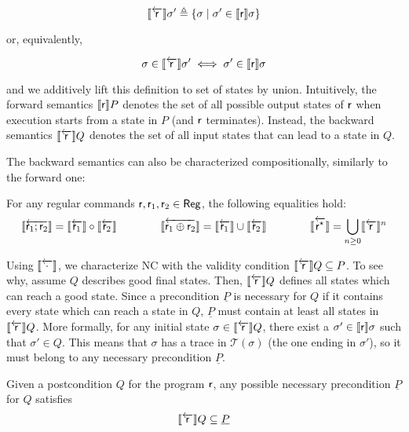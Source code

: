 \begin{equation}
	\llbracket\overleftarrow{\mathsf{r}}\rrbracket \sigma' \triangleq \{ \sigma \mid \sigma' \in \llbracket\mathsf{r}\rrbracket \sigma \} \label{eq:sil:bwsem-definition}
\end{equation}

\noindent or, equivalently,

\begin{equation}
	\sigma \in \llbracket\overleftarrow{\mathsf{r}}\rrbracket \sigma' \iff \sigma' \in \llbracket\mathsf{r}\rrbracket \sigma  \label{eq:sil:bwsem-sigma-sigma'}
\end{equation}

\noindent and we additively lift this definition to set of states by union.
Intuitively, the forward semantics $\llbracket\mathsf{r}\rrbracket P$ denotes the set of all possible output states of $\mathsf{r}$ when execution starts from a state in $P$ (and $\mathsf{r}$ terminates).
Instead, the backward semantics $\llbracket\overleftarrow{\mathsf{r}}\rrbracket Q$ denotes the set of all input states that can lead to a state in $Q$.

The backward semantics can also be characterized compositionally, similarly to the forward one:

\begin{lemma}\label{lmm:sil:bwsem-calculus}
	For any regular commands $\mathsf{r},\mathsf{r}_1,\mathsf{r}_2\in \mathsf{Reg}$, the following equalities hold:
	\[
	\llbracket\overleftarrow{\mathsf{r}_1; \mathsf{r}_2}\rrbracket = \llbracket\overleftarrow{\mathsf{r}_1}\rrbracket \circ \llbracket\overleftarrow{\mathsf{r}_2}\rrbracket \qquad\qquad
	\llbracket\overleftarrow{\mathsf{r}_1 \oplus \mathsf{r}_2}\rrbracket = \llbracket\overleftarrow{\mathsf{r}_1}\rrbracket \cup \llbracket\overleftarrow{\mathsf{r}_2}\rrbracket \qquad\qquad
	\llbracket\overleftarrow{{\mathsf{r}^\star}}\rrbracket = \bigcup\limits_{n \ge 0} \llbracket\overleftarrow{\mathsf{r}}\rrbracket^n
	\]
\end{lemma}

Using $\llbracket\overleftarrow{\cdot}\rrbracket$, we characterize NC with the validity condition $\llbracket\overleftarrow{\mathsf{r}}\rrbracket Q \subseteq P$.
To see why, assume $Q$ describes good final states. Then, $\llbracket\overleftarrow{\mathsf{r}}\rrbracket Q$ defines all states which can reach a good state. Since a precondition $\underline{P}$ is necessary for $Q$ if it contains every state which can reach a state in $Q$, $\underline{P}$ must contain at least all states in $\llbracket\overleftarrow{\mathsf{r}}\rrbracket Q$. More formally, for any initial state $\sigma \in \llbracket\overleftarrow{\mathsf{r}}\rrbracket Q$, there exist a $\sigma' \in \llbracket\mathsf{r}\rrbracket \sigma$ such that $\sigma' \in Q$. This means that $\sigma$ has a trace in $\mathcal{T}(\sigma)$ (the one ending in $\sigma'$), so it must belong to any necessary precondition $\underline{P}$.

\begin{prop}\label{prop:sil:nc}
	Given a postcondition $Q$ for the program $\mathsf{r}$, any possible necessary precondition $\underline{P}$ for $Q$ satisfies
	\[
	\llbracket\overleftarrow{\mathsf{r}}\rrbracket Q \subseteq \underline{P}
	\]
\end{prop}

